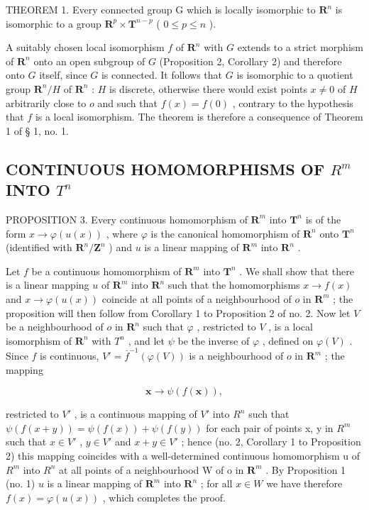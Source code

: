 THEOREM 1. Every connected group G which is locally isomorphic to \(\mathbf{R}^n\) is isomorphic to a group \(\mathbf{R}^p \times \mathbf{T}^{n-p}\) ( \(0 \leqslant p \leqslant n\) ).

A suitably chosen local isomorphism \(f\) of \(\mathbf{R}^n\) with \(G\) extends to a strict morphism of \(\mathbf{R}^n\) onto an open subgroup of \(G\) (Proposition 2, Corollary 2) and therefore onto \(G\) itself, since \(G\) is connected. It follows that \(G\) is isomorphic to a quotient group \(\mathbf{R}^n / H\) of \(\mathbf{R}^n\) : \(H\) is discrete, otherwise there would exist points \(x \neq 0\) of \(H\) arbitrarily close to \(o\) and such that \(f(x) = f(0)\) , contrary to the hypothesis that \(f\) is a local isomorphism. The theorem is therefore a consequence of Theorem 1 of § 1, no. 1.

\subsection{\texorpdfstring{CONTINUOUS HOMOMORPHISMS OF \(R^{m}\) INTO \(T^{n}\)}{CONTINUOUS HOMOMORPHISMS OF R TO THE M INTO T TO THE N}}

PROPOSITION 3. Every continuous homomorphism of \(\mathbf{R}^m\) into \(\mathbf{T}^n\) is of the form \(x \to \varphi(u(x))\) , where \(\varphi\) is the canonical homomorphism of \(\mathbf{R}^n\) onto \(\mathbf{T}^n\) (identified with \(\mathbf{R}^n / \mathbf{Z}^n\) ) and \(u\) is a linear mapping of \(\mathbf{R}^m\) into \(\mathbf{R}^n\) .

Let \(f\) be a continuous homomorphism of \(\mathbf{R}^m\) into \(\mathbf{T}^n\) . We shall show that there is a linear mapping \(u\) of \(\mathbf{R}^m\) into \(\mathbf{R}^n\) such that the homomorphisms \(x \to f(x)\) and \(x \to \varphi(u(x))\) coincide at all points of a neighbourhood of \(o\) in \(\mathbf{R}^m\) ; the proposition will then follow from Corollary 1 to Proposition 2 of no. 2. Now let \(V\) be a neighbourhood of \(o\) in \(\mathbf{R}^n\) such that \(\varphi\) , restricted to \(V\) , is a local isomorphism of \(\mathbf{R}^n\) with \(T^n\) , and let \(\psi\) be the inverse of \(\varphi\) , defined on \(\varphi(V)\) . Since \(f\) is continuous, \(V' = \overline{f}^{-1}(\varphi(V))\) is a neighbourhood of \(o\) in \(\mathbf{R}^m\) ; the mapping

\[
\boldsymbol {x} \rightarrow \psi (f (\boldsymbol {x})),
\]

restricted to \(V'\) , is a continuous mapping of \(V'\) into \(R^n\) such that \(\psi(f(x+y)) = \psi(f(x)) + \psi(f(y))\) for each pair of points x, y in \(R^m\) such that \(x \in V'\) , \(y \in V'\) and \(x + y \in V'\) ; hence (no. 2, Corollary 1 to Proposition 2) this mapping coincides with a well-determined continuous homomorphism u of \(R^m\) into \(R^n\) at all points of a neighbourhood W of o in \(\mathbf{R}^m\) . By Proposition 1 (no. 1) \(u\) is a linear mapping of \(\mathbf{R}^m\) into \(\mathbf{R}^n\) ; for all \(x \in W\) we have therefore \(f(x) = \varphi(u(x))\) , which completes the proof.

